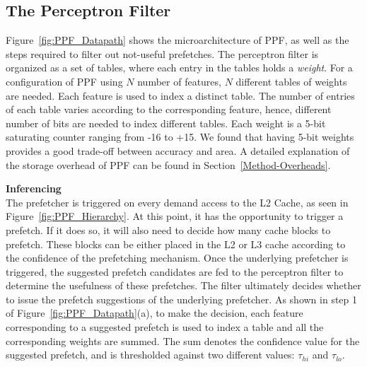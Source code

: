 \subsection{The Perceptron Filter}
\label{Arch-Perceptron}

Figure~\ref{fig:PPF_Datapath} shows the microarchitecture of PPF, as
well as the steps required to filter out not-useful prefetches. The
perceptron filter is organized as a set of tables, where each entry in
the tables holds a \textit{weight}.  For a configuration of PPF using
$N$ number of features, $N$ different tables of weights are needed.
Each feature is used to index a distinct table. The number of entries
of each table varies according to the corresponding feature, hence,
different number of bits are needed to index different tables. Each
weight is a 5-bit saturating counter ranging from -16 to +15. We found
that having 5-bit weights provides a good trade-off between accuracy
and area. A detailed explanation of the storage overhead of PPF can
be found in Section~\ref{Method-Overheads}.


\noindent \textbf{Inferencing}\\
The {\color{red}prefetcher} is triggered on every demand access to the L2
Cache, as seen in Figure~\ref{fig:PPF_Hierarchy}.  At this point, 
it has the opportunity to trigger a prefetch.
If it does so, it will also need to decide how many cache blocks to
prefetch.  These blocks can be either placed in the L2 or L3 cache
according to the confidence of the prefetching mechanism.  Once the
{\color{red}underlying} prefetcher is triggered, the suggested prefetch candidates are
fed to the perceptron filter to determine the usefulness of these
prefetches. The filter ultimately decides whether to issue the
prefetch suggestions of the {\color{red}underlying} prefetcher. As shown in step 1
of Figure~\ref{fig:PPF_Datapath}(a), to make the decision,
each feature corresponding to a suggested prefetch is used to index a
table and all the corresponding weights are summed. The sum denotes
the confidence value for the suggested prefetch, and is thresholded
against two different values: $\tau_{hi}$ and $\tau_{lo}$.

